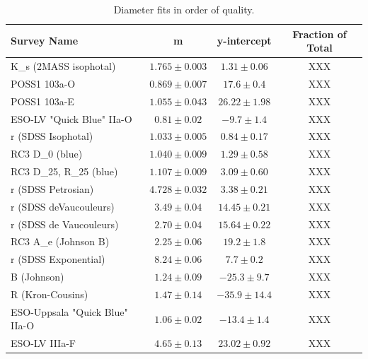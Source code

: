 \documentclass[iop]{emulateapj-rtx4}
\begin{document}
\begin{table}[ht]\footnotesize
\begin{center}
\begin{tabular}{l c c c}
 \hline \hline
 Survey Name                			& m   				& y-intercept			& Fraction of Total	\\
  \hline \hline 
K\_s (2MASS isophotal)			& $1.765 \pm 0.003$		& $1.31 \pm 0.06$		&	XXX			\\
POSS1 103a-O					& $0.869 \pm  0.007$	& $17.6 \pm 0.4$		&      XXX			\\
POSS1 103a-E					& $1.055 \pm 0.043$		& $26.22 \pm 1.98$		&	XXX			\\
ESO-LV "Quick Blue" IIa-O		& $0.81 \pm 0.02$		& $-9.7 \pm 1.4$		&	XXX			\\
r (SDSS Isophotal)				& $1.033 \pm 0.005$		& $0.84 \pm 0.17$		&	XXX			\\
RC3 D\_0 (blue)				& $1.040 \pm 0.009$		& $1.29 \pm 0.58$		&	XXX			\\
RC3 D\_25, R\_25 (blue)			& $1.107 \pm 0.009$		& $3.09 \pm 0.60$		&	XXX			\\
r (SDSS Petrosian)				& $4.728 \pm 0.032$		& $3.38 \pm 0.21$		&	XXX			\\
r (SDSS deVaucouleurs)			& $3.49 \pm 0.04$		& $14.45 \pm 0.21$		&	XXX			\\
r (SDSS de Vaucouleurs)			& $2.70 \pm 0.04$		& $15.64 \pm 0.22$		&	XXX			\\
RC3 A\_e (Johnson B)			& $2.25 \pm 0.06$		& $19.2 \pm 1.8$		&	XXX			\\
r (SDSS Exponential)			& $8.24 \pm 0.06$		& $7.7 \pm 0.2$		&	XXX			\\
B (Johnson)					& $1.24 \pm 0.09$		& $-25.3 \pm 9.7$		&	XXX			\\
R (Kron-Cousins)				& $1.47 \pm 0.14$		& $-35.9 \pm 14.4$		&	XXX			\\
ESO-Uppsala "Quick Blue" IIa-O	& $1.06 \pm 0.02$		& $-13.4 \pm 1.4$		&	XXX			\\
ESO-LV IIIa-F					& $4.65 \pm 0.13$		& $23.02 \pm 0.92$		&	XXX			\\
\hline
\end{tabular}
\end{center}
  \caption{\small{Diameter fits in order of quality.}}
  \label{diameter_fits}
\end{table}
\end{document}

